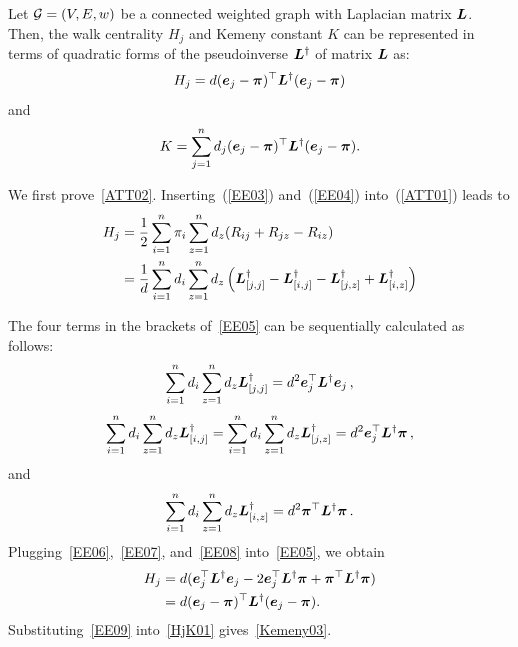 \documentclass[10pt,twocolumn,twoside]{IEEEtran}
\begin{document}
\begin{lemma}\label{HjK}
    Let \(\mathcal{G}=(V,E,w)\) be a connected weighted graph  with  Laplacian matrix \(\boldsymbol{L}\). Then, the walk centrality \(H_j\) and Kemeny constant \(K\) can be represented  in terms of quadratic forms of the pseudoinverse \(\boldsymbol{L}^{\dagger}\)  of   matrix  \(\boldsymbol{L}\) as:
    \begin{equation}\label{ATT02}
        H_j=d(\boldsymbol{e}_j - \boldsymbol{\pi})^{\top} \boldsymbol{L}^{\dagger} (\boldsymbol{e}_j - \boldsymbol{\pi})
    \end{equation}
    and
    \begin{equation}\label{Kemeny03}
        K= \sum_{j=1}^{n} d_j (\boldsymbol{e}_j - \boldsymbol{\pi})^{\top} \boldsymbol{L}^{\dagger} (\boldsymbol{e}_j - \boldsymbol{\pi}).
    \end{equation}
\end{lemma}
\begin{IEEEproof}
    We first prove~\eqref{ATT02}. Inserting~(\ref{EE03}) and~(\ref{EE04}) into~(\ref{ATT01}) leads to
    \begin{equation}\label{EE05}
        \begin{split}
            H_j&=\frac{1}{2} \sum_{i=1}^{n} \pi_i \sum_{z=1}^{n} d_z(R_{ij}+R_{jz}-R_{iz}) \\
            &=\frac{1}{d} \sum_{i=1}^{n} d_i \sum_{z=1}^{n} d_z \left({\boldsymbol{L}}_{[j,j]}^{\dagger}-{\boldsymbol{L}}_{[i,j]}^{\dagger}-{\boldsymbol{L}}_{[j,z]}^{\dagger}+{\boldsymbol{L}}_{[i,z]}^{\dagger}\right) \\
        \end{split}
    \end{equation}

    The four terms in the brackets of~\eqref{EE05} can be sequentially calculated as follows:
    \begin{equation}\label{EE06}
        \sum_{i=1}^{n} d_i \sum_{z=1}^{n} d_z {\boldsymbol{L}}_{[j,j]}^{\dagger}=d^2 \boldsymbol{e}_j^{\top} \boldsymbol{L}^{\dagger} \boldsymbol{e}_j\,,
    \end{equation}
    \begin{equation}\label{EE07}
        \sum_{i=1}^{n} d_i \sum_{z=1}^{n} d_z {\boldsymbol{L}}_{[i,j]}^{\dagger}=\sum_{i=1}^{n} d_i \sum_{z=1}^{n} d_z {\boldsymbol{L}}_{[j,z]}^{\dagger}=d^2 \boldsymbol{e}_j^{\top} \boldsymbol{L}^{\dagger} \boldsymbol{\pi}\,,
    \end{equation}
    and
    \begin{equation}\label{EE08}
        \sum_{i=1}^{n} d_i  \sum_{z=1}^{n} d_z {\boldsymbol{L}}_{[i,z]}^{\dagger}=d^2 \boldsymbol{\pi}^{\top} \boldsymbol{L}^{\dagger} \boldsymbol{\pi} \,.
    \end{equation}
    Plugging~\eqref{EE06},~\eqref{EE07}, and~\eqref{EE08}  into~\eqref{EE05}, we obtain
    \begin{equation}\label{EE09}
        \begin{split}
            H_j&=d(\boldsymbol{e}_j^{\top} \boldsymbol{L}^{\dagger} \boldsymbol{e}_j - 2 \boldsymbol{e}_j^{\top} \boldsymbol{L}^{\dagger} \boldsymbol{\pi} + \boldsymbol{\pi}^{\top} \boldsymbol{L}^{\dagger} \boldsymbol{\pi}) \\
            &=d(\boldsymbol{e}_j - \boldsymbol{\pi})^{\top} \boldsymbol{L}^{\dagger} (\boldsymbol{e}_j - \boldsymbol{\pi}).
        \end{split}
    \end{equation}
    Substituting~\eqref{EE09}  into~\eqref{HjK01} gives~\eqref{Kemeny03}.
\end{IEEEproof}
\end{document}
